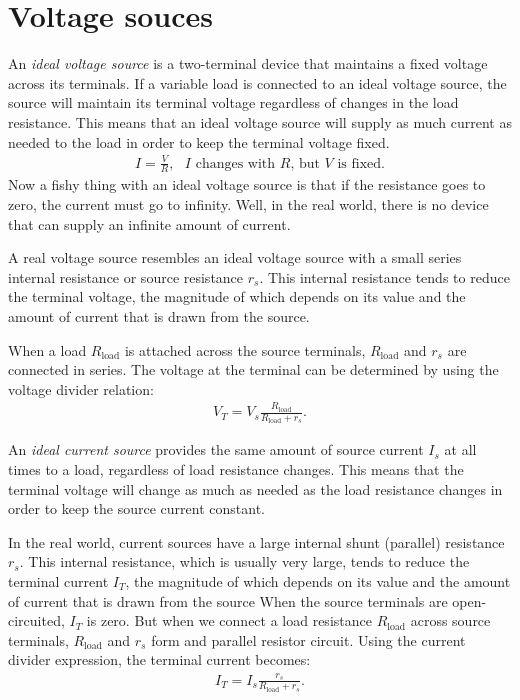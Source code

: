 \documentclass[../../document]{subfiles}
\begin{document}
\section{Voltage souces}
An \emph{ideal voltage source} is a two-terminal device that maintains a fixed
voltage across its terminals. If a variable load is connected to an ideal
voltage source, the source will maintain its terminal voltage regardless of
changes in the load resistance. This means that an ideal voltage source will
supply as much current as needed to the load in order to keep the terminal
voltage fixed. \cite{practical_electronics}
\begin{gather}
	I=\frac{V}{R},\text{ \(I\) changes with \(R\), but \(V\) is fixed}. 
\end{gather}
Now a fishy thing with an ideal voltage source is that if the resistance goes
to zero, the current must go to infinity. Well, in the real world, there is no
device that can supply an infinite amount of current. \cite{practical_electronics}

A real voltage source resembles an ideal voltage source with a small series
internal resistance or source resistance \(r_s\). This internal resistance
tends to reduce the terminal voltage, the magnitude of which depends on its
value and the amount of current that is drawn from the source. 

When a load \(R_{\text{load}}\) is attached across the source terminals,
\(R_{\text{load}}\) and \(r_s\) are connected in series. The voltage at the
terminal can be determined by using the voltage divider relation: \cite{practical_electronics}
\begin{gather}
	V_T = V_s \frac{R_{\text{load}}}{R_{\text{load}}+r_s}.
\end{gather}

An \emph{ideal current source} provides the same amount of source current \(I_s\)  at
all times to a load, regardless of load resistance changes. This means that the
terminal voltage will change as much as needed as the load resistance changes
in order to keep the source current constant. \cite{practical_electronics}

In the real world, current sources have a large internal shunt (parallel)
resistance \(r_s\). This internal resistance, which is usually very large,
tends to reduce the terminal current \(I_T\),  the magnitude of which depends
on its value and the amount of current that is drawn from the source When the
source terminals are open-circuited, \(I_T\) is zero. But when we connect a
load resistance \(R_{\text{load}}\) across source terminals,
\(R_{\text{load}}\) and \(r_s\) form and parallel resistor circuit. Using the
current divider expression, the terminal current becomes: \cite{practical_electronics}
\begin{gather}
	I_T = I_s\frac{r_s}{R_{\text{load}}+r_s}.
\end{gather}
\end{document}
